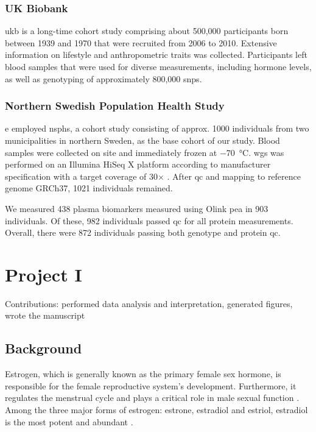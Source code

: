 \documentclass[draft, twoside=false]{scrbook}
\begin{document}
\subsection{UK Biobank}
\Gls{ukb} is a long-time cohort study comprising about 500,000 participants born between 1939 and 1970 that were recruited from 2006 to 2010.
Extensive information on lifestyle and anthropometric traits was collected.
Participants left blood samples that were used for diverse measurements, including hormone levels, as well as genotyping of approximately 800,000 \glspl{snp}.

\subsection{Northern Swedish Population Health Study}
e employed \gls{nsphs}, a cohort study consisting of approx. 1000 individuals from two municipalities in northern Sweden, as the base cohort of our study.
Blood samples were collected on site and immediately frozen at \qty{-70}{\celsius}.
\Gls{wgs} was performed on an Illumina HiSeq X platform according to manufacturer specification with a target coverage of 30$\times$ \cite{Ameur2017}.
After \gls{qc} and mapping to reference genome GRCh37, 1021 individuals remained.

We measured 438 plasma biomarkers measured using Olink \gls{pea} in 903 individuals.
Of these, 982 individuals passed \gls{qc} for all protein measurements.
Overall, there were 872 individuals passing both genotype and protein \gls{qc}.



\chapter{Project I}
{
    \parindent 0pt \color{gray}
    Contributions: performed data analysis and interpretation, generated figures, wrote the manuscript
}

\section{Background}
Estrogen, which is generally known as the primary female sex hormone, is responsible for the female reproductive system's development.
Furthermore, it regulates the menstrual cycle and plays a critical role in male sexual function \cite{Bates2013b,Hess1997b}. 
Among the three major forms of estrogen: estrone, estradiol and estriol, estradiol is the most potent and abundant \cite{Thomas2013c}.
\end{document}
